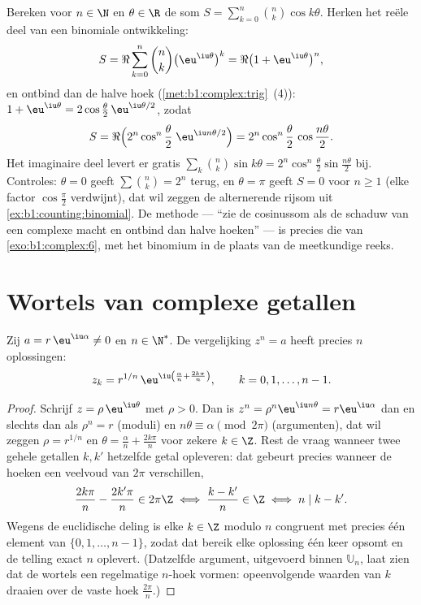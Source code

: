 \begin{example}\label{ex:b1:complex:binomsum}
Bereken voor $n \in \N$ en $\theta \in \R$ de som $S = \sum_{k=0}^{n}
\binom nk \cos k\theta$. Herken het reële deel van een binomiale
ontwikkeling:
\[
S = \Re\sum_{k=0}^n \binom nk \bigl(\eu^{\iu\theta}\bigr)^k
= \Re\bigl(1 + \eu^{\iu\theta}\bigr)^n ,
\]
en ontbind dan de halve hoek (\cref{met:b1:complex:trig}~(4)): $1 +
\eu^{\iu\theta} = 2\cos\frac\theta2\,\eu^{\iu\theta/2}$, zodat
\[
S = \Re\Bigl(2^n\cos^n\frac\theta2\;\eu^{\iu n\theta/2}\Bigr)
= 2^n \cos^n\frac\theta2\,\cos\frac{n\theta}2 .
\]
Het imaginaire deel levert er gratis $\sum_k\binom nk\sin k\theta =
2^n\cos^n\frac\theta2\sin\frac{n\theta}2$ bij. Controles: $\theta = 0$
geeft $\sum\binom nk = 2^n$ terug, en $\theta = \pi$ geeft $S = 0$ voor
$n \geq 1$ (elke factor $\cos\frac\pi2$ verdwijnt), dat wil zeggen de
alternerende rijsom uit \cref{ex:b1:counting:binomial}. De methode ---
``zie de cosinussom als de schaduw van een complexe macht en ontbind
dan halve hoeken'' --- is precies die van \cref{exo:b1:complex:6}, met
het binomium in de plaats van de meetkundige reeks.
\end{example}

\section{Wortels van complexe getallen}

\begin{theorem}[$n$-de wortels]\label{thm:b1:complex:roots}
Zij $a = r\,\eu^{\iu\alpha} \neq 0$ en $n \in \N^*$. De vergelijking
$z^n = a$ heeft precies $n$ oplossingen:
\[
z_k = r^{1/n}\, \eu^{\iu\left(\frac{\alpha}{n} +
\frac{2k\pi}{n}\right)},
\qquad k = 0, 1, \dots, n - 1 .
\]
\end{theorem}

\begin{proof}
Schrijf $z = \rho\,\eu^{\iu\theta}$ met $\rho > 0$. Dan is $z^n = \rho^n
\eu^{\iu n\theta} = r \eu^{\iu\alpha}$ dan en slechts dan als $\rho^n =
r$ (moduli) en $n\theta \equiv \alpha \pmod{2\pi}$ (argumenten), dat wil
zeggen $\rho = r^{1/n}$ en $\theta = \frac{\alpha}{n} + \frac{2k\pi}{n}$
voor zekere $k \in \Z$. Rest de vraag wanneer twee gehele getallen $k,
k'$ hetzelfde getal opleveren: dat gebeurt precies wanneer de hoeken een
veelvoud van $2\pi$ verschillen,
\[
\frac{2k\pi}n - \frac{2k'\pi}n \in 2\pi\Z
\iff \frac{k - k'}n \in \Z
\iff n \mid k - k' .
\]
Wegens de euclidische deling is elke $k \in \Z$ modulo $n$ congruent met
precies één element van $\{0, 1, \dots, n-1\}$, zodat dat bereik elke
oplossing één keer opsomt en de telling exact $n$ oplevert. (Datzelfde
argument, uitgevoerd binnen $\mathbb U_n$, laat zien dat de wortels een
regelmatige $n$-hoek vormen: opeenvolgende waarden van $k$ draaien over
de vaste hoek $\frac{2\pi}n$.)
\end{proof}

